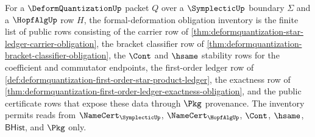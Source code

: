 \begin{definition}
\label{def:deformquantization-formal-deformation-obligation-inventory}
For a $\DeformQuantizationUp$ packet $Q$ over a $\SymplecticUp$ boundary $\Sigma$ and a $\HopfAlgUp$ row $H$, the formal-deformation obligation inventory is the finite list of public rows consisting of the carrier row of \autoref{thm:deformquantization-star-ledger-carrier-obligation}, the bracket classifier row of \autoref{thm:deformquantization-bracket-classifier-obligation}, the $\Cont$ and $\hsame$ stability rows for the coefficient and commutator endpoints, the first-order ledger row of \autoref{def:deformquantization-first-order-star-product-ledger}, the exactness row of \autoref{thm:deformquantization-first-order-ledger-exactness-obligation}, and the public certificate rows that expose these data through $\Pkg$ provenance. The inventory permits reads from $\NameCert_{\SymplecticUp}$, $\NameCert_{\HopfAlgUp}$, $\Cont$, $\hsame$, $\mathsf{BHist}$, and $\Pkg$ only.
\end{definition}

